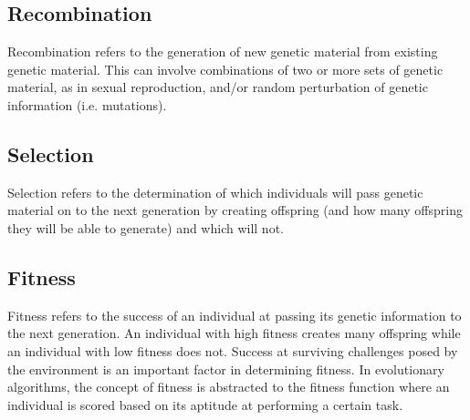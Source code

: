 \subsection{Recombination}

Recombination refers to the generation of new genetic material from existing genetic material. This can involve combinations of two or more sets of genetic material, as in sexual reproduction, and/or random perturbation of genetic information (i.e. mutations).

\subsection{Selection}

Selection refers to the determination of which individuals will pass genetic material on to the next generation by creating offspring (and how many offspring they will be able to generate) and which will not.

\subsection{Fitness}

Fitness refers to the success of an individual at passing its genetic information to the next generation. An individual with high fitness creates many offspring while an individual with low fitness does not. Success at surviving challenges posed by the environment is an important factor in determining fitness. In evolutionary algorithms, the concept of fitness is abstracted to the fitness function where an individual is scored based on its aptitude at performing a certain task.